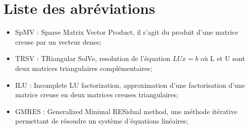 \section{Liste des abréviations}
  \begin{itemize}
    \item SpMV : Sparse Matrix Vector Product, il s'agit du produit d'une matrice creuse par un vecteur dense;
    \item TRSV : TRiangular SolVe, resolution de l'équation $LUx=b$ où L et U sont deux matrices triangulaires complémentaires;
    \item ILU : Incomplete LU factorization, approximation d'une factorisation d'une matrice creuse en deux matrices creuses triangulaires;
    \item GMRES : Generalized Minimal RESidual method, une méthode itérative permettant de résoudre un système d'équations linéaires;
  \end{itemize}
